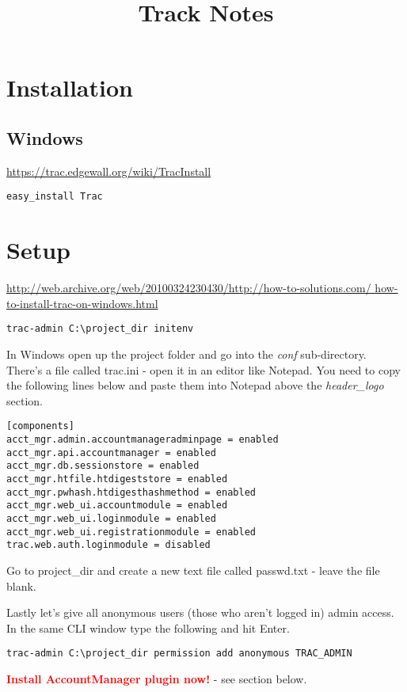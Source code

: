\documentclass{report}
\title{Track Notes}
\begin{document}
\tableofcontents

\chapter{Installation}
\section{Windows}
\url{https://trac.edgewall.org/wiki/TracInstall}

\begin{verbatim}
easy_install Trac
\end{verbatim}

\chapter{Setup}
\url{http://web.archive.org/web/20100324230430/http://how-to-solutions.com/
how-to-install-trac-on-windows.html}

\begin{verbatim}
trac-admin C:\project_dir initenv
\end{verbatim}
 
In Windows open up the project folder and go into the \textit{conf} sub-directory. 
There's a file called trac.ini - open it in an editor like Notepad. You need to copy 
the following lines below and paste them into Notepad above the \textit{header\_logo} section.

\begin{verbatim}
[components]
acct_mgr.admin.accountmanageradminpage = enabled
acct_mgr.api.accountmanager = enabled
acct_mgr.db.sessionstore = enabled
acct_mgr.htfile.htdigeststore = enabled
acct_mgr.pwhash.htdigesthashmethod = enabled
acct_mgr.web_ui.accountmodule = enabled
acct_mgr.web_ui.loginmodule = enabled
acct_mgr.web_ui.registrationmodule = enabled
trac.web.auth.loginmodule = disabled
\end{verbatim}

Go to project\_dir and create a new text file called passwd.txt - leave the file blank.

Lastly let's give all anonymous users (those who aren't logged in) admin access. In the same 
CLI window type the following and hit Enter.
\begin{verbatim}
trac-admin C:\project_dir permission add anonymous TRAC_ADMIN
\end{verbatim}

\textbf{\textcolor{red}{Install AccountManager plugin now!}} - see section below.
\end{document}
